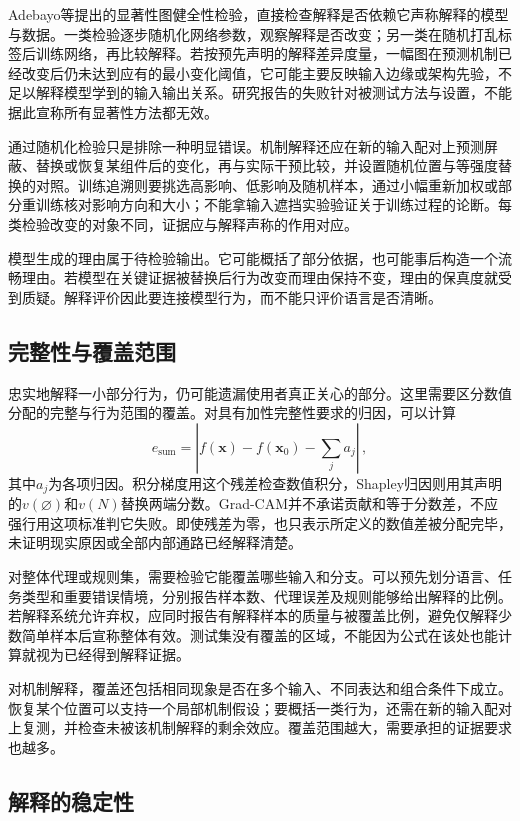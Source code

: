Adebayo等提出的显著性图健全性检验，直接检查解释是否依赖它声称解释的模型与数据。一类检验逐步随机化网络参数，观察解释是否改变；另一类在随机打乱标签后训练网络，再比较解释。若按预先声明的解释差异度量，一幅图在预测机制已经改变后仍未达到应有的最小变化阈值，它可能主要反映输入边缘或架构先验，不足以解释模型学到的输入输出关系。研究报告的失败针对被测试方法与设置，不能据此宣称所有显著性方法都无效。

通过随机化检验只是排除一种明显错误。机制解释还应在新的输入配对上预测屏蔽、替换或恢复某组件后的变化，再与实际干预比较，并设置随机位置与等强度替换的对照。训练追溯则要挑选高影响、低影响及随机样本，通过小幅重新加权或部分重训练核对影响方向和大小；不能拿输入遮挡实验验证关于训练过程的论断。每类检验改变的对象不同，证据应与解释声称的作用对应。

模型生成的理由属于待检验输出。它可能概括了部分依据，也可能事后构造一个流畅理由。若模型在关键证据被替换后行为改变而理由保持不变，理由的保真度就受到质疑。解释评价因此要连接模型行为，而不能只评价语言是否清晰。

\subsection{完整性与覆盖范围}
\label{sec:interpretability-quality-coverage}

忠实地解释一小部分行为，仍可能遗漏使用者真正关心的部分。这里需要区分数值分配的完整与行为范围的覆盖。对具有加性完整性要求的归因，可以计算
\[
 e_{\mathrm{sum}}
 =\left|f(\bm{x})-f(\bm{x}_0)-\sum_j a_j\right|\, ,
\]
其中$a_j$为各项归因。积分梯度用这个残差检查数值积分，Shapley归因则用其声明的$v(\varnothing)$和$v(N)$替换两端分数。Grad-CAM并不承诺贡献和等于分数差，不应强行用这项标准判它失败。即使残差为零，也只表示所定义的数值差被分配完毕，未证明现实原因或全部内部通路已经解释清楚。

对整体代理或规则集，需要检验它能覆盖哪些输入和分支。可以预先划分语言、任务类型和重要错误情境，分别报告样本数、代理误差及规则能够给出解释的比例。若解释系统允许弃权，应同时报告有解释样本的质量与被覆盖比例，避免仅解释少数简单样本后宣称整体有效。测试集没有覆盖的区域，不能因为公式在该处也能计算就视为已经得到解释证据。

对机制解释，覆盖还包括相同现象是否在多个输入、不同表达和组合条件下成立。恢复某个位置可以支持一个局部机制假设；要概括一类行为，还需在新的输入配对上复测，并检查未被该机制解释的剩余效应。覆盖范围越大，需要承担的证据要求也越多。

\subsection{解释的稳定性}
\label{sec:interpretability-quality-stability}

